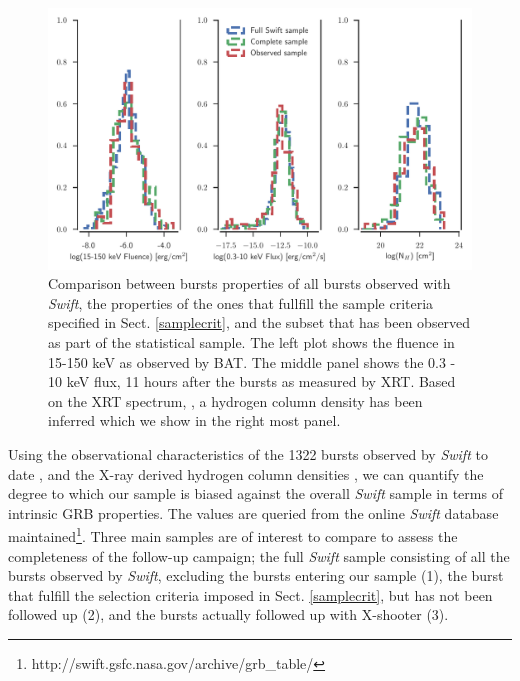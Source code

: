 \documentclass{aa}    %
\begin{document}
\begin{figure}
	\centerline{\includegraphics[width=18cm]{figures/completeness_BAT.pdf}}
	\caption{Comparison between bursts properties of all bursts observed with
	\textit{Swift}, the properties of the ones that fullfill the sample criteria
	specified in Sect. \ref{samplecrit}, and the subset that has been observed as
	part of the statistical sample. The left plot shows the fluence in 15-150 keV
	as observed by BAT. The middle panel shows the 0.3 - 10 keV flux, 11 hours
	after the bursts as measured by XRT. Based on the XRT spectrum,
	\citep{Evans2009}, a hydrogen column density has been inferred which we show in
	the right most panel.}
	\label{fig:swift_complete}
\end{figure}

Using the observational characteristics of the 1322 bursts observed by
\textit{Swift} to date \cite{Gehrels2009}, and the X-ray derived hydrogen column
densities \citep{Evans2009}, we can quantify the degree to which our sample is
biased against the overall \textit{Swift} sample in terms of intrinsic GRB
properties. The values are queried from the online \textit{Swift} database
maintained\footnote{http://swift.gsfc.nasa.gov/archive/grb\_table/}. Three main
samples are of interest to compare to assess the completeness of the follow-up
campaign; the full \textit{Swift} sample consisting of all the bursts observed
by \textit{Swift}, excluding the bursts entering our sample (1), the burst that
fulfill the selection criteria imposed in Sect. \ref{samplecrit}, but has not
been followed up (2), and the bursts actually followed up with X-shooter (3).


\end{document}
